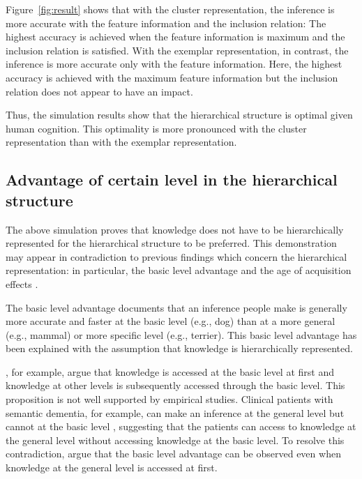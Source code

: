 \documentclass[doc]{apa6}
\begin{document}
Figure~\ref{fig:result} shows that with the cluster representation, the inference is more accurate
with the feature information and the inclusion relation: The highest accuracy is achieved when the
feature information is maximum and the inclusion relation is satisfied.  With the exemplar
representation, in contrast, the inference is more accurate only with the feature information.
Here, the highest accuracy is achieved with the maximum feature information but the inclusion
relation does not appear to have an impact.

Thus, the simulation results show that the hierarchical structure is optimal given human cognition.
This optimality is more pronounced with the cluster representation than with the exemplar
representation.





\subsection*{Advantage of certain level in the hierarchical structure}

The above simulation proves that knowledge does not have to be hierarchically represented for the
hierarchical structure to be preferred. This demonstration may appear in contradiction to previous
findings which concern the hierarchical representation: in particular, the basic level advantage
\parencite{Mervis1981a, Rosch1976a} and the age of acquisition effects \parencite{Gerhand1998a,
Morrison1995a}.

The basic level advantage documents that an inference people make is generally more accurate and
faster at the basic level (e.g., dog) than at a more general (e.g., mammal) or more specific level
(e.g., terrier). This basic level advantage has been explained with the assumption that knowledge is
hierarchically represented.

\textcite{Jolicoeur1984a}, for example, argue that knowledge is accessed at the basic level at first
and knowledge at other levels is subsequently accessed through the basic level. This proposition is
not well supported by empirical studies. Clinical patients with semantic dementia, for example, can
make an inference at the general level but cannot at the basic level \parencite{Hodges1995a},
suggesting that the patients can access to knowledge at the general level without accessing
knowledge at the basic level. To resolve this contradiction, \textcite{Rogers2007a} argue that the
basic level advantage can be observed even when knowledge at the general level is accessed at first.
\end{document}

